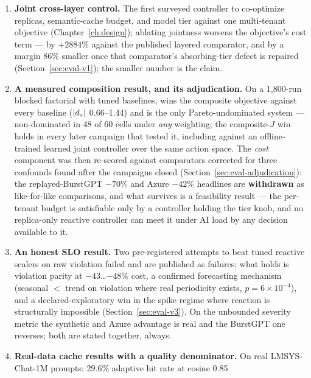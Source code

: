 \begin{enumerate}
  \item \textbf{Joint cross-layer control.} The first surveyed controller to
        co-optimize replicas, semantic-cache budget, and model tier against
        one multi-tenant objective (Chapter~\ref{ch:design}); ablating
        jointness worsens the objective's cost term --- by $+2884\%$ against
        the published layered comparator, and by a margin $86\%$ smaller
        once that comparator's absorbing-tier defect is repaired
        (Section~\ref{sec:eval-v1}); the smaller number is the claim.
  \item \textbf{A measured composition result, and its adjudication.} On a
        1{,}800-run blocked factorial with tuned baselines, \polyforge{} wins
        the composite objective against every baseline ($|d_z|$ 0.66--1.44)
        and is the only Pareto-undominated system --- non-dominated in 48 of
        60 cells under \emph{any} weighting; the composite-$J$ win holds in
        every later campaign that tested it, including against an
        offline-trained learned joint controller over the same action space.
        The \emph{cost} component was then re-scored against comparators
        corrected for three confounds found after the campaigns closed
        (Section~\ref{sec:eval-adjudication}): the replayed-BurstGPT $-70\%$
        and Azure $-42\%$ headlines are \textbf{withdrawn} as like-for-like
        comparisons, and what survives is a feasibility result --- the
        per-tenant budget is satisfiable only by a controller holding the
        tier knob, and no replica-only reactive controller can meet it under
        AI load by any decision available to it.
  \item \textbf{An honest SLO result.} Two pre-registered attempts to beat
        tuned reactive scalers on raw violation failed and are published as
        failures; what holds is violation parity at $-43$\ldots$-48\%$ cost,
        a confirmed forecasting mechanism (seasonal $<$ trend on violation
        where real periodicity exists, $p=6\times10^{-4}$), and a
        declared-exploratory win in the spike regime where reaction is
        structurally impossible (Section~\ref{sec:eval-v3}). On the
        unbounded severity metric the synthetic and Azure advantage is real
        and the BurstGPT one reverses; both are stated together, always.
  \item \textbf{Real-data cache results with a quality denominator.} On real
        LMSYS-Chat-1M prompts: 29.6\% adaptive hit rate at cosine 0.85

\end{enumerate}
